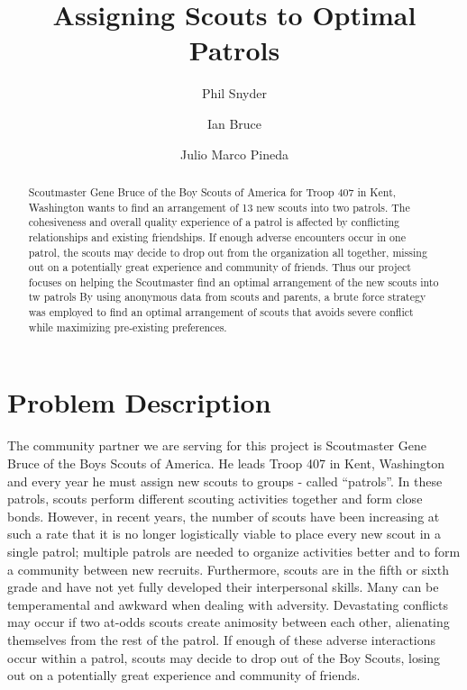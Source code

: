 \documentclass{amsart}
\theoremstyle{definition}
\theoremstyle{remark}
\numberwithin{equation}{section}
\begin{document}
\title{Assigning Scouts to Optimal Patrols}
\author{Phil Snyder}
\author{Ian Bruce}
\author{Julio Marco Pineda}

\begin{abstract}
Scoutmaster Gene Bruce of the Boy Scouts of America for Troop 407 in Kent, Washington wants to find an arrangement of 13 new scouts into two patrols. The cohesiveness and overall quality experience of a patrol is affected by conflicting relationships and existing friendships. If enough adverse encounters occur in one patrol, the scouts may decide to drop out from the organization all together, missing out on a potentially great experience and community of friends. Thus our project focuses on helping the Scoutmaster find an optimal arrangement of the new scouts into tw patrols By using anonymous data from scouts and parents, a brute force strategy was employed to find an optimal arrangement of scouts that avoids severe conflict while maximizing pre-existing preferences. 
\end{abstract}

\maketitle
\section*{Problem Description}
The community partner we are serving for this project is Scoutmaster Gene Bruce of the Boys Scouts of America. He leads Troop 407 in Kent, Washington and every year he must assign new scouts to groups - called ``patrols''. In these patrols, scouts perform different scouting activities together and form close bonds. However, in recent years, the number of scouts have been increasing at such a rate that it is no longer logistically viable to place every new scout in a single patrol; multiple patrols are needed to organize activities better and to form a community between new recruits. Furthermore, scouts are in the fifth or sixth grade and have not yet fully developed their interpersonal skills. Many can be temperamental and awkward when dealing with adversity. Devastating conflicts may occur if two at-odds scouts create animosity between each other, alienating themselves from the rest of the patrol. If enough of these adverse interactions occur within a patrol, scouts may decide to drop out of the Boy Scouts, losing out on a potentially great experience and community of friends.
\end{document}
